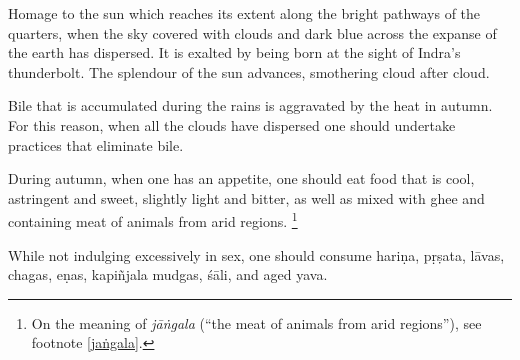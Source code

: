 \begin{translation}
\item[15--16]
Homage to the sun %
which reaches its extent 
along the bright pathways of the quarters, %
when the sky covered %
with clouds and dark blue %
across the expanse of the earth has dispersed. %
It is exalted by being born at the sight of Indra’s thunderbolt. %
The splendour of the sun advances, smothering cloud after cloud.

\item[17]
Bile that is accumulated during the rains is aggravated by the heat in autumn. For this reason, when all the clouds have dispersed one should undertake practices that eliminate bile. 

\item[18] 

During autumn, when one has an appetite, one should eat food that is cool, astringent and sweet, slightly light and  bitter, as well as mixed with ghee and containing meat of animals from arid regions.%
    \footnote{On the meaning of \emph{jāṅgala} (``the meat of animals from arid regions''), see footnote \ref{jaṅgala}.}

\item[19]
While not indulging excessively in sex, one should consume \gls{hariṇa}, %
\gls{pṛṣata}, %
\glspl{lāva}, %
\glspl{chaga}, %
\glspl{eṇa}, %
\gls{kapiñjala} %
\glspl{mudga}, %
\gls{śāli}, and aged \gls{yava}. %


\end{translation}
